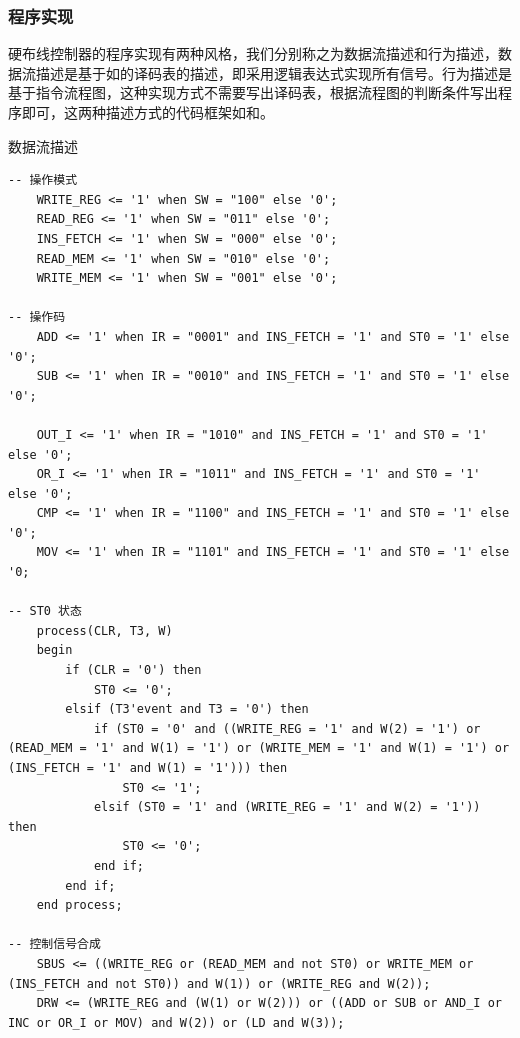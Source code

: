 \documentclass[lang=cn,11pt,a4paper,cite=authornum]{paper}
\begin{document}
\subsubsection{程序实现}

硬布线控制器的程序实现有两种风格，我们分别称之为数据流描述和行为描述，数据流描述是基于如的译码表的描述，即采用逻辑表达式实现所有信号。行为描述是基于指令流程图，这种实现方式不需要写出译码表，根据流程图的判断条件写出程序即可，这两种描述方式的代码框架如和。

\begin{code}
\caption{数据流描述\label{code:dataflow}}
\begin{verbatim}
-- 操作模式
    WRITE_REG <= '1' when SW = "100" else '0';
    READ_REG <= '1' when SW = "011" else '0';
    INS_FETCH <= '1' when SW = "000" else '0';
    READ_MEM <= '1' when SW = "010" else '0';
    WRITE_MEM <= '1' when SW = "001" else '0';
    
-- 操作码
    ADD <= '1' when IR = "0001" and INS_FETCH = '1' and ST0 = '1' else '0';
    SUB <= '1' when IR = "0010" and INS_FETCH = '1' and ST0 = '1' else '0';
    
    OUT_I <= '1' when IR = "1010" and INS_FETCH = '1' and ST0 = '1' else '0';
    OR_I <= '1' when IR = "1011" and INS_FETCH = '1' and ST0 = '1' else '0';
    CMP <= '1' when IR = "1100" and INS_FETCH = '1' and ST0 = '1' else '0';
    MOV <= '1' when IR = "1101" and INS_FETCH = '1' and ST0 = '1' else '0;
    
-- ST0 状态
    process(CLR, T3, W)
    begin
        if (CLR = '0') then
            ST0 <= '0';
        elsif (T3'event and T3 = '0') then
            if (ST0 = '0' and ((WRITE_REG = '1' and W(2) = '1') or (READ_MEM = '1' and W(1) = '1') or (WRITE_MEM = '1' and W(1) = '1') or (INS_FETCH = '1' and W(1) = '1'))) then
                ST0 <= '1';
            elsif (ST0 = '1' and (WRITE_REG = '1' and W(2) = '1')) then
                ST0 <= '0';
            end if;
        end if;
    end process;

-- 控制信号合成
    SBUS <= ((WRITE_REG or (READ_MEM and not ST0) or WRITE_MEM or (INS_FETCH and not ST0)) and W(1)) or (WRITE_REG and W(2));
    DRW <= (WRITE_REG and (W(1) or W(2))) or ((ADD or SUB or AND_I or INC or OR_I or MOV) and W(2)) or (LD and W(3));

\end{verbatim}
\end{code}
\end{document}
